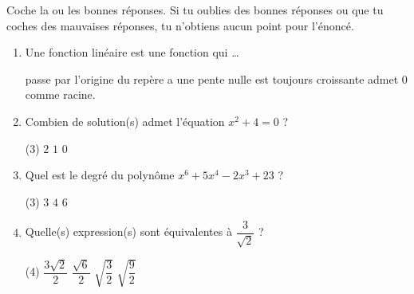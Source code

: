 %
%
    Coche la ou les bonnes réponses. Si tu oublies des bonnes réponses ou que tu coches des mauvaises réponses, tu n'obtiens aucun point pour l'énoncé.
    \begin{enumerate}
        \item Une fonction linéaire est une fonction qui \dots
              \begin{QCM}
                  \choice passe par l'origine du repère
                  \choice a une pente nulle
                  \choice est toujours croissante
                  \choice admet $0$ comme racine.
              \end{QCM}
        \item Combien de solution(s) admet l'équation $x^2+4=0$ ?
              \begin{QCM}(3)
                  \choice $2$
                  \choice $1$
                  \choice $0$
              \end{QCM}
        \item Quel est le degré du polynôme $x^6 + 5x^4 -2x^3 +23$ ?
              \begin{QCM}(3)
                  \choice $3$
                  \choice $4$
                  \choice $6$
              \end{QCM}
        \item Quelle(s) expression(s) sont équivalentes à $\dfrac{3}{\sqrt{2}}$ ?
              \begin{QCM}(4)
                  \choice $\dfrac{3\sqrt{2}}{2}$
                  \choice $\dfrac{\sqrt{6}}{2}$
                  \choice $\sqrt{\dfrac{3}{2}}$
                  \choice $\sqrt{\dfrac{9}{2}}$
              \end{QCM}
    \end{enumerate}
